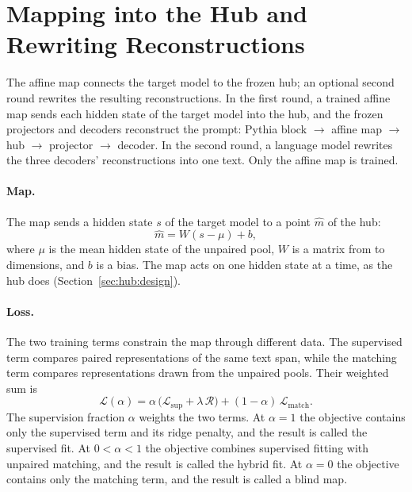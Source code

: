 \section{Mapping into the Hub and Rewriting Reconstructions}\label{sec:attack:method}

The affine map connects the target model to the frozen hub; an optional second round rewrites the resulting reconstructions.
In the first round, a trained affine map sends each hidden state of the target model into the hub, and the frozen projectors and decoders reconstruct the prompt: Pythia block  $\to$ affine map $\to$ hub $\to$ projector $\to$ decoder.
In the second round, a language model rewrites the three decoders' reconstructions into one text.
Only the affine map is trained.

\paragraph{Map.} The map sends a hidden state $s$ of the target model to a point $\hat m$ of the hub:
\begin{equation}
\hat m = W(s - \mu) + b ,
\label{eq:attack:map}
\end{equation}
where $\mu$ is the mean hidden state of the unpaired pool, $W$ is a matrix from  to  dimensions, and $b$ is a bias. %
The map acts on one hidden state at a time, as the hub does (Section~\ref{sec:hub:design}).

\paragraph{Loss.} %
The two training terms constrain the map through different data.
The supervised term compares paired representations of the same text span, while the matching term compares representations drawn from the unpaired pools.
Their weighted sum is
\begin{equation}
\mathcal{L}(\alpha) = \alpha\,\big(\mathcal{L}_{\text{sup}} + \lambda\,\mathcal{R}\big) + (1-\alpha)\,\mathcal{L}_{\text{match}} .
\label{eq:attack:loss}
\end{equation}
The supervision fraction $\alpha$ weights the two terms. %
At $\alpha = 1$ the objective contains only the supervised term and its ridge penalty, and the result is called the supervised fit.
At $0 < \alpha < 1$ the objective combines supervised fitting with unpaired matching, and the result is called the hybrid fit.
At $\alpha = 0$ the objective contains only the matching term, and the result is called a blind map.

